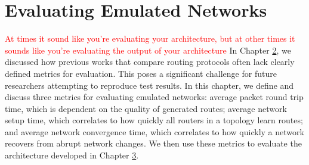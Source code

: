 \documentclass{uiucthesis2021}
\begin{document}
\chapter{Evaluating Emulated Networks}
\label{c4}
\textcolor{red}{At times it sound like you're evaluating your architecture, but at other times it sounds like you're evaluating the output of your architecture}
\noindent In Chapter \hyperref[c2]{2}, we discussed how previous works that compare routing protocols often lack clearly defined metrics for evaluation. This poses a significant challenge for future researchers attempting to reproduce test results. In this chapter, we define and discuss three metrics for evaluating emulated networks: average packet round trip time, which is dependent on the quality of generated routes; average network setup time, which correlates to how quickly all routers in a topology learn routes; and average network convergence time, which correlates to how quickly a network recovers from abrupt network changes. We then use these metrics to evaluate the architecture developed in Chapter \hyperref[c3]{3}. \\
\end{document}
